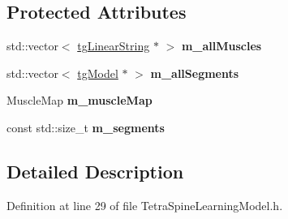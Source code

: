 \subsection*{Protected Attributes}
\begin{DoxyCompactItemize}
\item 
\hypertarget{class_base_spine_model_learning_a9cd74c4c79da8749fb5c8bffecede666}{std\-::vector$<$ \hyperlink{classtg_linear_string}{tg\-Linear\-String} $\ast$ $>$ {\bfseries m\-\_\-all\-Muscles}}\label{class_base_spine_model_learning_a9cd74c4c79da8749fb5c8bffecede666}

\item 
\hypertarget{class_base_spine_model_learning_a1c1e64b40b4c67189fbc67ad411f316a}{std\-::vector$<$ \hyperlink{classtg_model}{tg\-Model} $\ast$ $>$ {\bfseries m\-\_\-all\-Segments}}\label{class_base_spine_model_learning_a1c1e64b40b4c67189fbc67ad411f316a}

\item 
\hypertarget{class_base_spine_model_learning_a75cad2ae3b68f93d283550b417af5523}{Muscle\-Map {\bfseries m\-\_\-muscle\-Map}}\label{class_base_spine_model_learning_a75cad2ae3b68f93d283550b417af5523}

\item 
\hypertarget{class_base_spine_model_learning_a5d68dbbcbda4091b040279200a185d50}{const std\-::size\-\_\-t {\bfseries m\-\_\-segments}}\label{class_base_spine_model_learning_a5d68dbbcbda4091b040279200a185d50}

\end{DoxyCompactItemize}


\subsection{Detailed Description}


Definition at line 29 of file Tetra\-Spine\-Learning\-Model.\-h.



